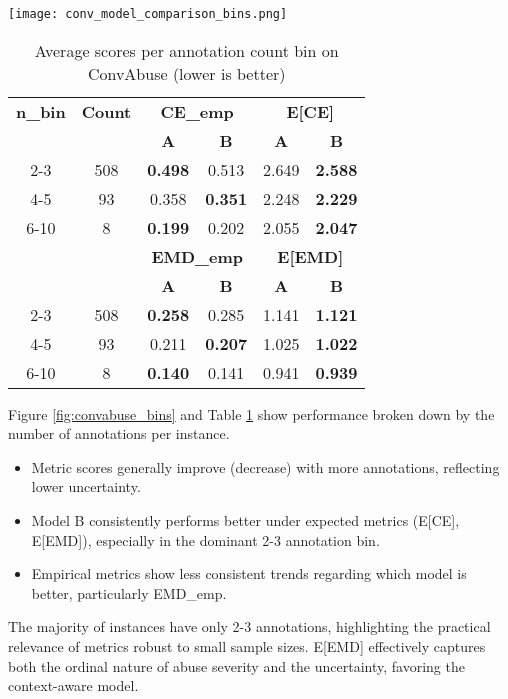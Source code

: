 \documentclass[journal]{IEEEtran}
\begin{document}
\begin{figure*}[t]
    \centering
    \texttt{[image: conv\_model\_comparison\_bins.png]}
    \caption{Model performance across annotation count bins on ConvAbuse for different metrics. Expected metrics (E[CE], E[EMD]) consistently favor Model B, especially with fewer annotations (2-3 bin), while empirical metrics show mixed results.}
    \label{fig:convabuse_bins}
\end{figure*}

\begin{table}[t]
\centering
\caption{Average scores per annotation count bin on ConvAbuse (lower is better)}
\label{tab:convabuse_bins_detailed} %
\small
\begin{tabular}{|c|c|cc|cc|}
\hline
\textbf{n\_bin} & \textbf{Count} & \multicolumn{2}{c|}{\textbf{CE\_emp}} & \multicolumn{2}{c|}{\textbf{E[CE]}} \\
 & & \textbf{A} & \textbf{B} & \textbf{A} & \textbf{B} \\
\hline
2-3 & 508 & \textbf{0.498} & 0.513 & 2.649 & \textbf{2.588} \\
4-5 & 93 & 0.358 & \textbf{0.351} & 2.248 & \textbf{2.229} \\
6-10 & 8 & \textbf{0.199} & 0.202 & 2.055 & \textbf{2.047} \\
\hline \hline
 & & \multicolumn{2}{c|}{\textbf{EMD\_emp}} & \multicolumn{2}{c|}{\textbf{E[EMD]}} \\
  & & \textbf{A} & \textbf{B} & \textbf{A} & \textbf{B} \\
\hline
2-3 & 508 & \textbf{0.258} & 0.285 & 1.141 & \textbf{1.121} \\
4-5 & 93 & 0.211 & \textbf{0.207} & 1.025 & \textbf{1.022} \\
6-10 & 8 & \textbf{0.140} & 0.141 & 0.941 & \textbf{0.939} \\
\hline
\end{tabular}
\end{table}


Figure \ref{fig:convabuse_bins} and Table \ref{tab:convabuse_bins_detailed} show performance broken down by the number of annotations per instance.
\begin{itemize}
    \item Metric scores generally improve (decrease) with more annotations, reflecting lower uncertainty.
    \item Model B consistently performs better under expected metrics (E[CE], E[EMD]), especially in the dominant 2-3 annotation bin.
    \item Empirical metrics show less consistent trends regarding which model is better, particularly EMD\_emp.
\end{itemize}
The majority of instances have only 2-3 annotations, highlighting the practical relevance of metrics robust to small sample sizes. E[EMD] effectively captures both the ordinal nature of abuse severity and the uncertainty, favoring the context-aware model.
\end{document}
